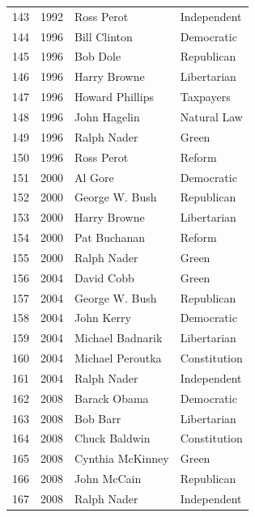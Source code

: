\documentclass[
  letterpaper,
  DIV=11,
  numbers=noendperiod]{scrreprt}
\begin{document}
\begin{tabular}{lrll}
143 &  1992 &              Ross Perot &            Independent \\
144 &  1996 &            Bill Clinton &             Democratic \\
145 &  1996 &                Bob Dole &             Republican \\
146 &  1996 &            Harry Browne &            Libertarian \\
147 &  1996 &         Howard Phillips &              Taxpayers \\
148 &  1996 &            John Hagelin &            Natural Law \\
149 &  1996 &             Ralph Nader &                  Green \\
150 &  1996 &              Ross Perot &                 Reform \\
151 &  2000 &                 Al Gore &             Democratic \\
152 &  2000 &          George W. Bush &             Republican \\
153 &  2000 &            Harry Browne &            Libertarian \\
154 &  2000 &            Pat Buchanan &                 Reform \\
155 &  2000 &             Ralph Nader &                  Green \\
156 &  2004 &              David Cobb &                  Green \\
157 &  2004 &          George W. Bush &             Republican \\
158 &  2004 &              John Kerry &             Democratic \\
159 &  2004 &        Michael Badnarik &            Libertarian \\
160 &  2004 &        Michael Peroutka &           Constitution \\
161 &  2004 &             Ralph Nader &            Independent \\
162 &  2008 &            Barack Obama &             Democratic \\
163 &  2008 &                Bob Barr &            Libertarian \\
164 &  2008 &           Chuck Baldwin &           Constitution \\
165 &  2008 &        Cynthia McKinney &                  Green \\
166 &  2008 &             John McCain &             Republican \\
167 &  2008 &             Ralph Nader &            Independent \\

\end{tabular}
\end{document}
